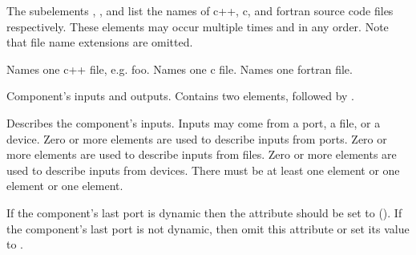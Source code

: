\documentclass[11pt]{article}
\begin{document}
\begin{description}
\begin{description}
    The subelements , , and 
    list the names of c++, c, and fortran source code files respectively.
    These elements may occur multiple times and in any order.
    Note that file name extensions are omitted.
    \begin{description}
       Names one c++ file,
      e.g. foo. 
       Names one c file.
       Names one fortran file.
    \end{description}
     Component's inputs and
    outputs.  Contains two elements,  followed by
    .
    \begin{description}
       Describes the
      component's inputs. Inputs may 
      come from a port, a file, or a device.  Zero or more 
      elements are used to describe inputs from ports.  Zero or more
       elements are used to describe inputs from files.  Zero
      or more  elements are used to describe inputs from
      devices.  There must be at least one  element or one
       element or one  element.

      If the component's last port is dynamic then the
       attribute should be set to 
      ().  If the component's last port
      is not dynamic, then omit this attribute or set its value to
      .


\end{description}
\end{description}
\end{description}
\end{document}
